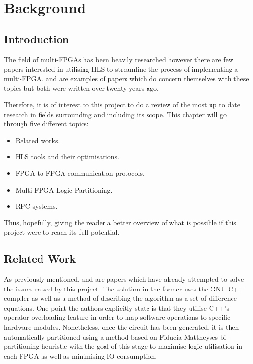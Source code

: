 \chapter{Background}
\label{chap:Background}

\section{Introduction}

The field of multi-FPGAs has been heavily researched however there are few papers interested in utilising HLS to streamline the process of implementing a multi-FPGA. \cite{564741} and \cite{707888} are examples of papers which do concern themselves with these topics but both were written over twenty years ago.

Therefore, it is of interest to this project to do a review of the most up to date research in fields surrounding and including its scope. This chapter will go through five different topics:

\begin{itemize}
    \item Related works.
    \item HLS tools and their optimisations.
    \item FPGA-to-FPGA communication protocols.
    \item Multi-FPGA Logic Partitioning.
    \item RPC systems.
\end{itemize}

Thus, hopefully, giving the reader a better overview of what is possible if this project were to reach its full potential.

\section{Related Work}
\label{sec:related_work}

As previously mentioned, \cite{564741} and \cite{707888} are papers which have already attempted to solve the issues raised by this project. The solution in the former uses the GNU C++ compiler as well as a method of describing the algorithm as a set of difference equations. One point the authors explicitly state is that they utilise C++'s operator overloading feature in order to map software operations to specific hardware modules. Nonetheless, once the circuit has been generated, it is then automatically partitioned using a method based on Fiducia-Mattheyses bi-partitioning heuristic \cite{1585498} with the goal of this stage to maximise logic utilisation in each FPGA as well as minimising IO consumption.

